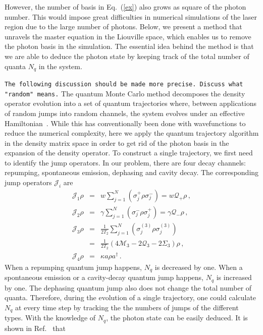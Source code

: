\documentclass[aps,
twocolumn,
superscriptaddress,groupedaddress]{revtex4}
\newcommand{\dmcomment}[1]{{\tt #1}}
\begin{document}
However, the number of basis in Eq.~(\ref{ex}) also grows as square of
the photon number.  This would impose great difficulties in numerical
simulations of the laser region due to the large number of photons.
Below, we present a method that unravels the master equation in the
Liouville space, which enables us to remove the photon basis in the
simulation. The essential idea behind the method is that we are able to
deduce the photon state by keeping track of the total number of quanta
$N_q$ in the system.

\dmcomment{The following discussion should be made more precise.
Discuss what "random" means.}
The quantum Monte Carlo method decomposes the density operator evolution
into a set of quantum trajectories where, between applications of random
jumps into random channels, the system evolves under an effective
Hamiltonian~\cite{Dalibard92,Dum92,Knight98}. While this has
conventionally been done with wavefunctions to reduce the numerical
complexity, here we apply the quantum trajectory algorithm in the
density matrix space in order to get rid of the photon basis in the
expansion of the density operator. To construct a single trajectory, we
first need to identify the jump operators. In our problem, there are
four decay channels: repumping, spontaneous emission, dephasing and
cavity decay. The corresponding jump operators $\mathcal{J}_i$ are
\begin{eqnarray}
\mathcal{J}_1\rho&=&
w\sum_{j=1}^N(\sigma_j^+\rho\sigma_j^-)=w\mathcal{Q}_{+}\rho\,,
\nonumber\\
\mathcal{J}_2\rho&=&
\gamma\sum_{j=1}^N(\sigma_j^-\rho\sigma_j^+)=
\gamma \mathcal{Q}_{-}\rho\,,\nonumber\\
\mathcal{J}_3\rho&=&
\frac{1}{2T_2}\sum_{j=1}^N(\sigma_j^{(3)}\rho\sigma_j^{(3)})
\nonumber\\
&=&\frac{1}{2T_2}(4\mathcal{M}_3-2  \mathcal{Q}_3-2\Sigma_3)\rho\,,
\nonumber\\
\mathcal{J}_4\rho&=&\kappa a\rho a^{\dagger}\,.
\label{jumpo}
\end{eqnarray}
When a repumping quantum jump happens, $N_q$ is decreased by one. When a
spontaneous emission or a cavity-decay quantum jump happens, $N_q$ is
increased by one. The dephasing quantum jump also does not change the
total number of quanta. Therefore, during the evolution of a single
trajectory, one could calculate $N_q$ at every time step by tracking the
the numbers of jumps of the different types. With the knowledge of
$N_q$, the photon state can be easily deduced. It is shown in
Ref.~\cite{Holland13} that
\end{document}
